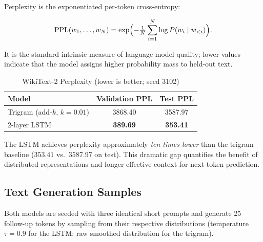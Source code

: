 Perplexity is the exponentiated per-token cross-entropy:

\[
\mathrm{PPL}(w_1,\dots,w_N) = \exp\Bigl(-\tfrac{1}{N}\sum_{i=1}^{N} \log P(w_i \mid w_{<i})\Bigr).
\]

It is the standard intrinsic measure of language-model quality; lower
values indicate that the model assigns higher probability mass to
held-out text.

\begin{table}[h]
\centering
\caption{WikiText-2 Perplexity (lower is better; seed 3102)}
\label{tab:q5_results}
\begin{tabular}{lcc}
\toprule
Model                            & Validation PPL & Test PPL \\
\midrule
Trigram (add-$k$, $k = 0.01$)    & 3868.40 & 3587.97 \\
2-layer LSTM                     & \textbf{389.69} & \textbf{353.41} \\
\bottomrule
\end{tabular}
\end{table}

The LSTM achieves perplexity approximately \emph{ten times lower} than
the trigram baseline ($353.41$ vs.\ $3587.97$ on test). This dramatic
gap quantifies the benefit of distributed representations and longer
effective context for next-token prediction.

\subsection{Text Generation Samples}

Both models are seeded with three identical short prompts and generate
25 follow-up tokens by sampling from their respective distributions
(temperature $\tau = 0.9$ for the LSTM; raw smoothed distribution for the
trigram).

